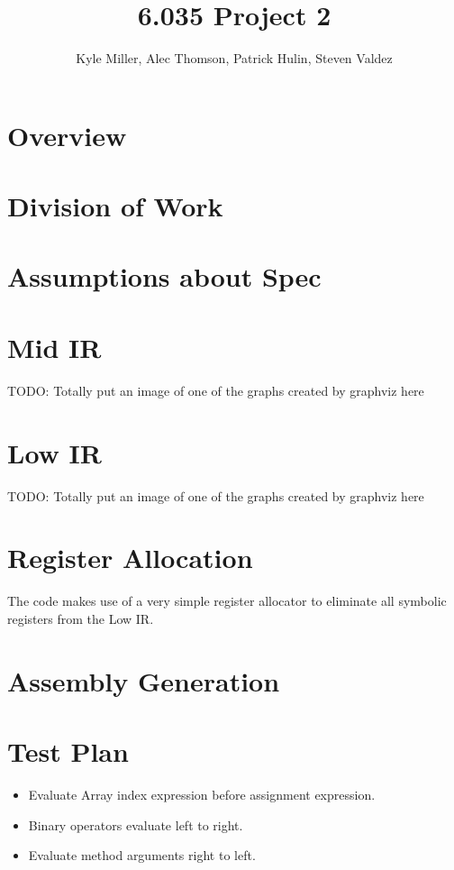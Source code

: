 \documentclass[11pt]{article}
\title{6.035 Project 2}
\author{Kyle Miller, Alec Thomson, Patrick Hulin, Steven Valdez}
\begin{document}
 
\maketitle

\section {Overview}


\section{Division of Work} 
\label{sec:division}

\section{Assumptions about Spec} 
\label{sec:assumptions}

\section {Mid IR}

TODO: Totally put an image of one of the graphs created by graphviz here 

\section {Low IR} 

TODO: Totally put an image of one of the graphs created by graphviz here 

\section {Register Allocation} 

The code makes use of a very simple register allocator to eliminate
all symbolic registers from the Low IR. 

\section {Assembly Generation}  

\section {Test Plan}


\begin{itemize}
\item Evaluate Array index expression before assignment expression. 
\item Binary operators evaluate left to right. 
\item Evaluate method arguments right to left. 
\end{itemize}
\end{document}
